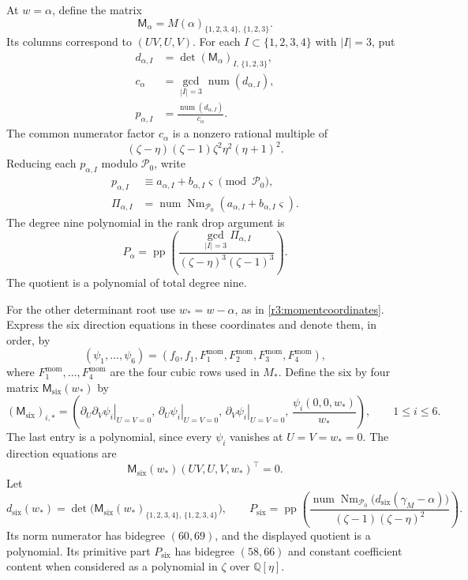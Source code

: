 \documentclass[11pt,a4paper]{article}
\numberwithin{equation}{section}
\theoremstyle{plain}
\theoremstyle{definition}
\theoremstyle{remark}
\begin{document}
At $w=\alpha$, define the matrix
\[
 \mathsf M_\alpha=M(\alpha)_{\{1,2,3,4\},\,\{1,2,3\}}.
\]
Its columns correspond to $(UV,U,V)$. For each $I\subset\{1,2,3,4\}$ with $|I|=3$, put
\[
 \begin{aligned}
 d_{\alpha,I}&=\det(\mathsf M_\alpha)_{I,\,\{1,2,3\}},\\
 c_\alpha&=\gcd_{|I|=3}\operatorname{num}(d_{\alpha,I}),\\
 p_{\alpha,I}&=\frac{\operatorname{num}(d_{\alpha,I})}{c_\alpha}.
 \end{aligned}
\]
The common numerator factor $c_\alpha$ is a nonzero rational multiple of
\[
 (\zeta-\eta)(\zeta-1)\zeta^2\eta^2(\eta+1)^2.
\]
Reducing each $p_{\alpha,I}$ modulo $\mathcal P_0$, write
\[
 \begin{aligned}
 p_{\alpha,I}&\equiv a_{\alpha,I}+b_{\alpha,I}\varsigma\pmod \mathcal P_0,\\
 \Pi_{\alpha,I}&=\operatorname{num}\operatorname{Nm}_{\mathcal P_0}
                   (a_{\alpha,I}+b_{\alpha,I}\varsigma).
 \end{aligned}
\]
The degree nine polynomial in the rank drop argument is
\[
 P_\alpha=\operatorname{pp}\left(
 \frac{\gcd_{|I|=3}\Pi_{\alpha,I}}
 {(\zeta-\eta)^3(\zeta-1)^3}\right).
\]
The quotient is a polynomial of total degree nine.

For the other determinant root use $w_*=w-\alpha$, as
in \eqref{r3:momentcoordinates}.
Express the six direction equations in these coordinates and denote
them, in order, by
\[
 (\psi_1,\ldots,\psi_6)
 =(f_0,f_1,F_1^{\mathrm{mom}},F_2^{\mathrm{mom}},F_3^{\mathrm{mom}},F_4^{\mathrm{mom}}),
\]
where $F_1^{\mathrm{mom}},\ldots,F_4^{\mathrm{mom}}$ are the four cubic rows used in $M_*$.
Define the six by four matrix $\mathsf M_{\mathrm{six}}(w_*)$ by
\[
 (\mathsf M_{\mathrm{six}})_{i,*}
 =\left(
 \left.\partial_U\partial_V\psi_i\right|_{U=V=0},\,
 \left.\partial_U\psi_i\right|_{U=V=0},\,
 \left.\partial_V\psi_i\right|_{U=V=0},\,
 \frac{\psi_i(0,0,w_*)}{w_*}\right),\qquad 1\le i\le6.
\]
The last entry is a polynomial, since every $\psi_i$ vanishes at
$U=V=w_*=0$. The direction equations are
\[
 \mathsf M_{\mathrm{six}}(w_*)(UV,U,V,w_*)^{\top}=0.
\]
Let
\[
 d_{\mathrm{six}}(w_*)
 =\det\bigl(\mathsf M_{\mathrm{six}}(w_*)_{\{1,2,3,4\},\,\{1,2,3,4\}}\bigr),
 \qquad
 P_{\mathrm{six}}=\operatorname{pp}\left(
 \frac{\operatorname{num}\operatorname{Nm}_{\mathcal P_0}
       \bigl(d_{\mathrm{six}}(\gamma_M-\alpha)\bigr)}
 {(\zeta-1)(\zeta-\eta)^2}\right).
\]
Its norm numerator has bidegree $(60,69)$, and the displayed quotient
is a polynomial. Its primitive part $P_{\mathrm{six}}$ has bidegree $(58,66)$ and
constant coefficient content when considered as a
polynomial in $\zeta$ over $\mathbb Q[\eta]$.
\end{document}
